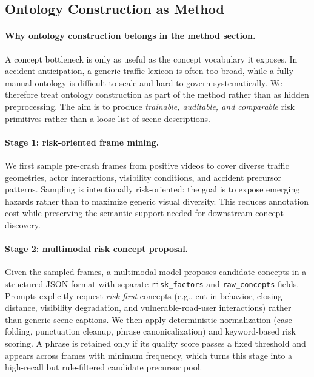 \subsection{Ontology Construction as Method}

\paragraph{Why ontology construction belongs in the method section.}
A concept bottleneck is only as useful as the concept vocabulary it exposes.
In accident anticipation, a generic traffic lexicon is often too broad, while
a fully manual ontology is difficult to scale and hard to govern
systematically. We therefore treat ontology construction as part of the method
rather than as hidden preprocessing. The aim is to produce \emph{trainable,
auditable, and comparable} risk primitives rather than a loose list of scene
descriptions.

\paragraph{Stage 1: risk-oriented frame mining.}
We first sample pre-crash frames from positive videos to cover diverse traffic
geometries, actor interactions, visibility conditions, and accident precursor
patterns. Sampling is intentionally risk-oriented: the goal is to expose
emerging hazards rather than to maximize generic visual diversity. This reduces
annotation cost while preserving the semantic support needed for downstream
concept discovery.

\paragraph{Stage 2: multimodal risk concept proposal.}
Given the sampled frames, a multimodal model proposes candidate concepts in a
structured JSON format with separate \texttt{risk\_factors} and
\texttt{raw\_concepts} fields. Prompts explicitly request \emph{risk-first}
concepts (e.g., cut-in behavior, closing distance, visibility degradation, and
vulnerable-road-user interactions) rather than generic scene captions. We then
apply deterministic normalization (case-folding, punctuation cleanup, phrase
canonicalization) and keyword-based risk scoring. A phrase is retained only if
its quality score passes a fixed threshold and appears across frames with
minimum frequency, which turns this stage into a high-recall but rule-filtered
candidate precursor pool.

